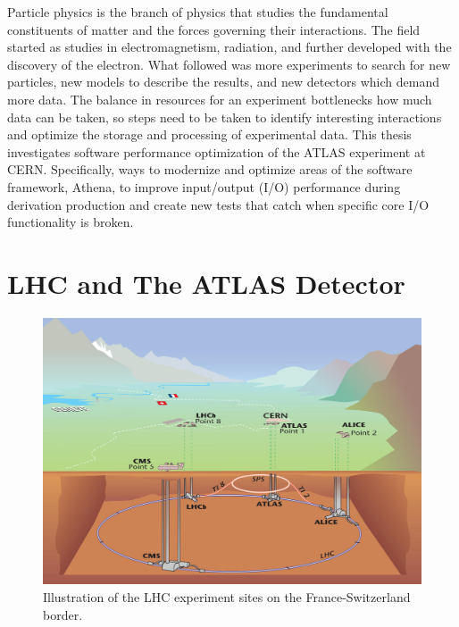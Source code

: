 Particle physics is the branch of physics that studies the fundamental constituents of matter and the forces governing their interactions.  
The field started as studies in electromagnetism, radiation, and further developed with the discovery of the electron.
What followed was more experiments to search for new particles, new models to describe the results, and new detectors which demand more data.
The balance in resources for an experiment bottlenecks how much data can be taken, so steps need to be taken to identify interesting interactions and optimize the storage and processing of experimental data.
This thesis investigates software performance optimization of the ATLAS experiment at CERN. 
Specifically, ways to modernize and optimize areas of the software framework, Athena, to improve input/output (I/O) performance during derivation production and create new tests that catch when specific core I/O functionality is broken.

\section{LHC and The ATLAS Detector}

\begin{figure}[h]
    \centering
    \includegraphics[width=.8\textwidth]{content/img/LHC illustration.jpg}
    \caption{Illustration of the LHC experiment sites on the France-Switzerland border.\cite{LHC_Illustration}}
    \label{fig:intro_LHC_sites}
\end{figure}

